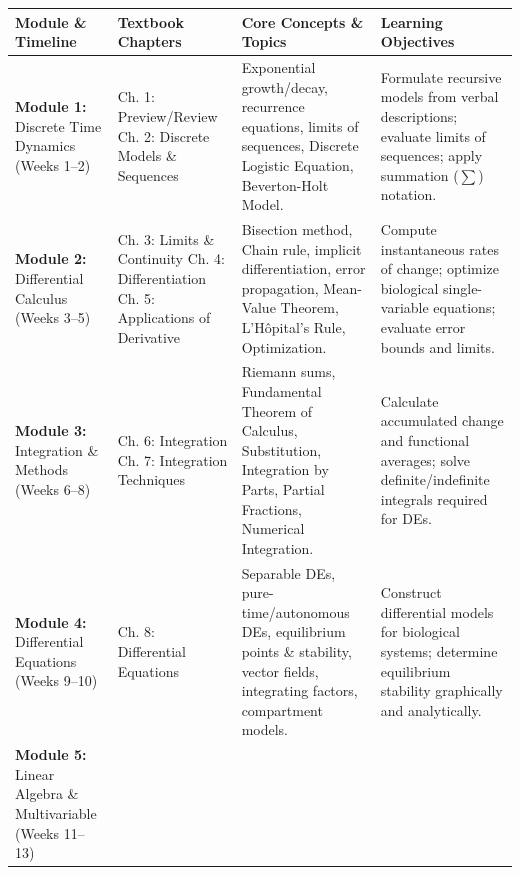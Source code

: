 \documentclass[10pt,letterpaper]{article}
\begin{document}
\begin{table}[h!]
\centering
\small
\begin{tabular}{p{2.2cm} p{3.2cm} p{5.5cm} p{5.0cm}}
\toprule
\textbf{Module \& Timeline} & \textbf{Textbook Chapters} & \textbf{Core Concepts \& Topics} & \textbf{Learning Objectives} \\
\midrule
\textbf{Module 1:} \newline Discrete Time Dynamics \newline (Weeks 1--2) 
& Ch. 1: Preview/Review \newline Ch. 2: Discrete Models \& Sequences 
& Exponential growth/decay, recurrence equations, limits of sequences, Discrete Logistic Equation, Beverton-Holt Model. 
& Formulate recursive models from verbal descriptions; evaluate limits of sequences; apply summation ($\sum$) notation. \\
\midrule
\textbf{Module 2:} \newline Differential Calculus \newline (Weeks 3--5) 
& Ch. 3: Limits \& Continuity \newline Ch. 4: Differentiation \newline Ch. 5: Applications of Derivative 
& Bisection method, Chain rule, implicit differentiation, error propagation, Mean-Value Theorem, L'H\^opital's Rule, Optimization. 
& Compute instantaneous rates of change; optimize biological single-variable equations; evaluate error bounds and limits. \\
\midrule
\textbf{Module 3:} \newline Integration \& Methods \newline (Weeks 6--8) 
& Ch. 6: Integration \newline Ch. 7: Integration Techniques 
& Riemann sums, Fundamental Theorem of Calculus, Substitution, Integration by Parts, Partial Fractions, Numerical Integration. 
& Calculate accumulated change and functional averages; solve definite/indefinite integrals required for DEs. \\
\midrule
\textbf{Module 4:} \newline Differential Equations \newline (Weeks 9--10) 
& Ch. 8: Differential Equations 
& Separable DEs, pure-time/autonomous DEs, equilibrium points \& stability, vector fields, integrating factors, compartment models. 
& Construct differential models for biological systems; determine equilibrium stability graphically and analytically. \\
\midrule
\textbf{Module 5:} \newline Linear Algebra \& Multivariable \newline (Weeks 11--13) 

\end{tabular}
\end{table}
\end{document}

